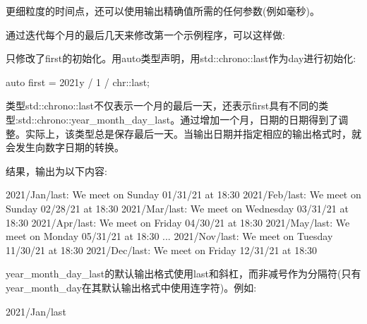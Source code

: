 更细粒度的时间点，还可以使用输出精确值所需的任何参数(例如毫秒)。


通过迭代每个月的最后几天来修改第一个示例程序，可以这样做:



只修改了first的初始化。用auto类型声明，用std::chrono::last作为day进行初始化:

\begin{cpp}
auto first = 2021y / 1 / chr::last;
\end{cpp}

类型std::chrono::last不仅表示一个月的最后一天，还表示first具有不同的类型:std::chrono::year\_month\_day\_last。通过增加一个月，日期的日期得到了调整。实际上，该类型总是保存最后一天。当输出日期并指定相应的输出格式时，就会发生向数字日期的转换。

结果，输出为以下内容:

\begin{shell}
2021/Jan/last:
 We meet on Sunday 01/31/21 at 18:30
2021/Feb/last:
 We meet on Sunday 02/28/21 at 18:30
2021/Mar/last:
 We meet on Wednesday 03/31/21 at 18:30
2021/Apr/last:
 We meet on Friday 04/30/21 at 18:30
2021/May/last:
 We meet on Monday 05/31/21 at 18:30
...
2021/Nov/last:
 We meet on Tuesday 11/30/21 at 18:30
2021/Dec/last:
 We meet on Friday 12/31/21 at 18:30
\end{shell}

year\_month\_day\_last的默认输出格式使用last和斜杠，而非减号作为分隔符(只有year\_month\_day在其默认输出格式中使用连字符)。例如:

\begin{shell}
2021/Jan/last
\end{shell}

